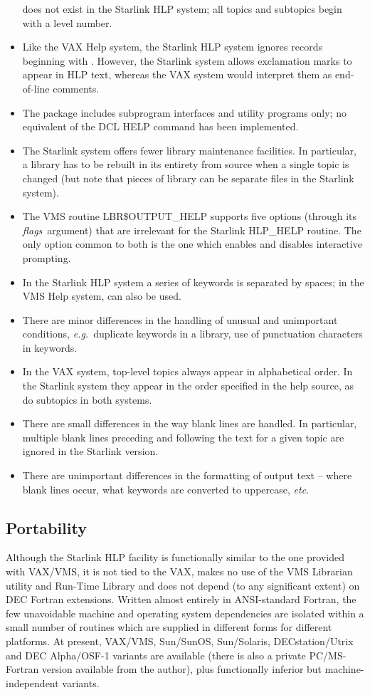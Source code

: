 \documentclass[11pt,nolof]{starlink}
\providecommand{\qt}[1]{``{\tt{#1}}''}
\providecommand{\fstring}[1]{\hbox{\hspace{0.05em}{\qt{#1}}\hspace{0.05em}}}
\begin{document}
\begin{itemize}
does not exist in the Starlink HLP system;  all topics and subtopics
begin with a level number.
\item Like the VAX Help system, the Starlink HLP system ignores
records beginning with \fstring{!}.  However, the Starlink
system allows exclamation marks to appear in HLP text, whereas
the VAX system would interpret them as end-of-line comments.
\item The package includes subprogram interfaces and utility
programs only;  no equivalent of the DCL HELP command
has been implemented.
\item The Starlink system offers fewer library maintenance facilities.
In particular, a library has to be rebuilt in its entirety from source
when a single topic is changed (but note that pieces of library
can be separate files in the Starlink system).
\item The VMS routine LBR\$OUTPUT\_HELP supports five options
(through its \textit{flags}\, argument) that are irrelevant for the
Starlink HLP\_HELP routine.  The only option common to both is
the one which enables and disables interactive prompting.
\item In the Starlink HLP system a series of keywords is
separated by spaces;  in the VMS Help system, \fstring{/} can also
be used.
\item There are minor differences in the handling of unusual
and unimportant conditions, \textit{e.g.}\ duplicate keywords in
a library, use of punctuation characters in keywords.
\item In the VAX system, top-level topics always appear in
alphabetical order.  In the Starlink system they appear in the order
specified in the help source, as do subtopics in both systems.
\item There are small differences in the way blank lines
are handled.  In particular, multiple
blank lines preceding and following
the text for a given topic are ignored in the Starlink version.
\item There are unimportant differences in the formatting of
output text -- where blank lines occur, what keywords are
converted to uppercase, \textit{etc}.
\end{itemize}

\subsection{Portability}
Although the Starlink HLP facility is
functionally similar to the one provided
with VAX/VMS, it is not tied to the VAX, makes no use of the VMS
Librarian utility and Run-Time Library and does not depend (to any
significant extent) on DEC Fortran extensions.  Written almost entirely
in ANSI-standard Fortran, the few unavoidable machine and operating
system dependencies are isolated within a small number of routines which
are supplied in different forms for different platforms.  At present,
VAX/VMS, Sun/SunOS, Sun/Solaris, DECstation/Utrix and DEC Alpha/OSF-1
variants are available (there is also a private PC/MS-Fortran version
available from the author), plus
functionally inferior but machine-independent variants.
\end{document}
